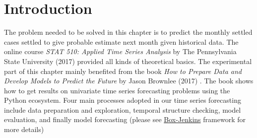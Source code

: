 \section{Introduction}
The problem needed to be solved in this chapter is to predict the monthly settled cases settled to give probable estimate next month given historical data. The online course \textit{STAT 510: Applied Time Series Analysis} by The Pennsylvania State University (2017)\hl{\cite{7}} provided all kinds of theoretical basics. The experimental part of this chapter mainly benefited from the book \textit{How to Prepare Data and Develop Models to Predict the Future} by Jason Brownlee (2017) \hl{\cite{9}}. The book shows how to get results on univariate time series forecasting problems using the Python ecosystem. Four main processes adopted in our time series forecasting include data preparation and exploration, temporal structure checking, model evaluation, and finally model forecasting (please see \href{https://www.mailman.columbia.edu/research/population-health-methods/box-jenkins-methodology}{\colorbox{Graylight}{Box-Jenkins}} framework for more details)

